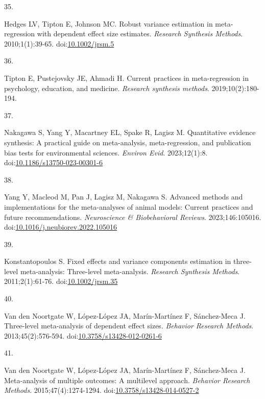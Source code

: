 \documentclass[
  american,
  man, donotrepeattitle,floatsintext]{apa7}
\newlength{\cslhangindent}
\newlength{\csllabelwidth}
\newenvironment{CSLReferences}[2] %
 {\begin{list}{}{%
  \setlength{\itemindent}{0pt}
  \setlength{\leftmargin}{0pt}
  \setlength{\parsep}{0pt}
  \ifodd #1
   \setlength{\leftmargin}{\cslhangindent}
   \setlength{\itemindent}{-1\cslhangindent}
  \fi
  \setlength{\itemsep}{#2\baselineskip}}}
 {\end{list}}
\newcommand{\CSLLeftMargin}[1]{\parbox[t]{\csllabelwidth}{\strut#1\strut}}
\newcommand{\CSLRightInline}[1]{\parbox[t]{\linewidth - \csllabelwidth}{\strut#1\strut}}
\begin{document}
\begin{CSLReferences}{0}{1}
\CSLLeftMargin{35. }%
\CSLRightInline{Hedges LV, Tipton E, Johnson MC. {Robust variance estimation in meta-regression with dependent effect size estimates}. \emph{Research Synthesis Methods}. 2010;1(1):39-65. doi:\href{https://doi.org/10.1002/jrsm.5}{10.1002/jrsm.5}}

\CSLLeftMargin{36. }%
\CSLRightInline{Tipton E, Pustejovsky JE, Ahmadi H. Current practices in meta-regression in psychology, education, and medicine. \emph{Research synthesis methods}. 2019;10(2):180-194.}

\CSLLeftMargin{37. }%
\CSLRightInline{Nakagawa S, Yang Y, Macartney EL, Spake R, Lagisz M. Quantitative evidence synthesis: A practical guide on meta-analysis, meta-regression, and publication bias tests for environmental sciences. \emph{Environ Evid}. 2023;12(1):8. doi:\href{https://doi.org/10.1186/s13750-023-00301-6}{10.1186/s13750-023-00301-6}}

\CSLLeftMargin{38. }%
\CSLRightInline{Yang Y, Macleod M, Pan J, Lagisz M, Nakagawa S. Advanced methods and implementations for the meta-analyses of animal models: {Current} practices and future recommendations. \emph{Neuroscience \& Biobehavioral Reviews}. 2023;146:105016. doi:\href{https://doi.org/10.1016/j.neubiorev.2022.105016}{10.1016/j.neubiorev.2022.105016}}

\CSLLeftMargin{39. }%
\CSLRightInline{Konstantopoulos S. Fixed effects and variance components estimation in three-level meta-analysis: {Three}-level meta-analysis. \emph{Research Synthesis Methods}. 2011;2(1):61-76. doi:\href{https://doi.org/10.1002/jrsm.35}{10.1002/jrsm.35}}

\CSLLeftMargin{40. }%
\CSLRightInline{Van den Noortgate W, López-López JA, Marín-Martínez F, Sánchez-Meca J. Three-level meta-analysis of dependent effect sizes. \emph{Behavior Research Methods}. 2013;45(2):576-594. doi:\href{https://doi.org/10.3758/s13428-012-0261-6}{10.3758/s13428-012-0261-6}}

\CSLLeftMargin{41. }%
\CSLRightInline{Van den Noortgate W, López-López JA, Marín-Martínez F, Sánchez-Meca J. Meta-analysis of multiple outcomes: A multilevel approach. \emph{Behavior Research Methods}. 2015;47(4):1274-1294. doi:\href{https://doi.org/10.3758/s13428-014-0527-2}{10.3758/s13428-014-0527-2}}


\end{CSLReferences}
\end{document}
